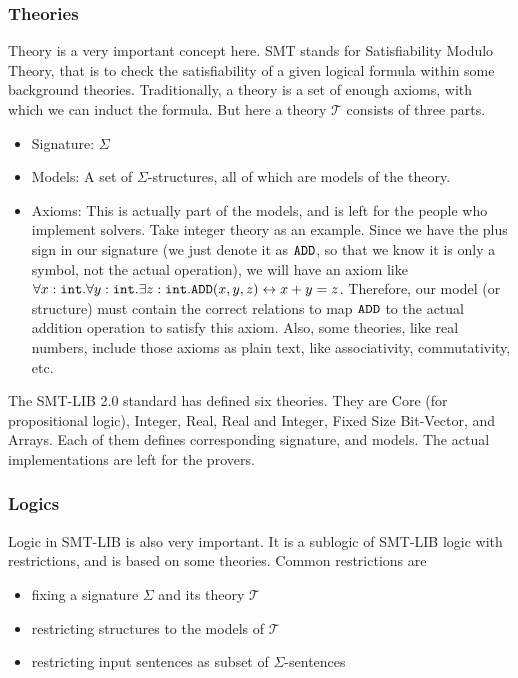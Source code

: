 \documentclass[10pt,twocolumn,letter]{article}
\theoremstyle{definition}
\begin{document}
\subsubsection{Theories}
Theory is a very important concept here. SMT stands for Satisfiability Modulo Theory, that is to check the satisfiability of a given logical formula within some background theories. Traditionally, a theory is a set of enough axioms, with which we can induct the formula. But here a theory $\mathcal{T}$ consists of three parts.
\begin{itemize}
\item Signature: $\Sigma$
\item Models: A set of $\Sigma$-structures, all of which are models of the theory.
\item Axioms: This is actually part of the models, and is left for the people who implement solvers. Take integer theory as an example. Since we have the plus sign in our signature (we just denote it as $\tt ADD$, so that we know it is only a symbol, not the actual operation), we will have an axiom like $\forall x:{\tt int}.\forall y:{\tt int}. \exists z:{\tt int}. {\tt ADD}(x,y,z) \leftrightarrow x + y = z$. Therefore, our model (or structure) must contain the correct relations to map $\tt ADD$ to the actual addition operation to satisfy this axiom. Also, some theories, like real numbers, include those axioms as plain text, like associativity, commutativity, etc.

\end{itemize}

The SMT-LIB 2.0 standard has defined six theories. They are Core (for propositional logic), Integer, Real, Real and Integer, Fixed Size Bit-Vector, and Arrays. Each of them defines corresponding signature, and models. The actual implementations are left for the provers.

\subsubsection{Logics}
Logic in SMT-LIB is also very important. It is a sublogic of SMT-LIB logic with restrictions, and is based on some theories. Common restrictions are
\begin{itemize}
\item fixing a signature $\Sigma$ and its theory $\mathcal{T}$
\item restricting structures to the models of $\mathcal{T}$
\item restricting input sentences as subset of $\Sigma$-sentences
\end{itemize}
\end{document}
